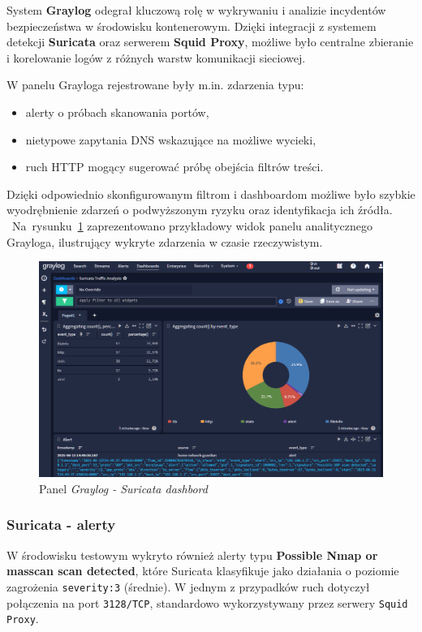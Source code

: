 \documentclass[
    left=2.5cm,         %
    right=2.5cm,        %
    top=2.5cm,          %
    bottom=3cm,         %
    bindingoffset=6mm,  %
    nohyphenation=true %
]{eiti/eiti-thesis} %
\begin{document}
System \textbf{Graylog} odegrał kluczową rolę w wykrywaniu i analizie incydentów bezpieczeństwa w środowisku kontenerowym. Dzięki integracji z systemem detekcji \textbf{Suricata} oraz serwerem \textbf{Squid Proxy}, możliwe było centralne zbieranie i korelowanie logów z różnych warstw komunikacji sieciowej.

W panelu Grayloga rejestrowane były m.in. zdarzenia typu:
\begin{itemize}
\item alerty o próbach skanowania portów,
\item nietypowe zapytania DNS wskazujące na możliwe wycieki,
\item ruch HTTP mogący sugerować próbę obejścia filtrów treści.
\end{itemize}

Dzięki odpowiednio skonfigurowanym filtrom i dashboardom możliwe było szybkie wyodrębnienie zdarzeń o podwyższonym ryzyku oraz identyfikacja ich źródła. 
~Na~rysunku~\ref{fig:graylog-suricata-dashboard} zaprezentowano przykładowy widok panelu analitycznego Grayloga, ilustrujący wykryte zdarzenia w czasie rzeczywistym.

\begin{figure}[H]
    \centering
    \includegraphics[width=\textwidth]{img/graylog_alerts.png}
    \caption{Panel \textit{Graylog - Suricata dashbord}}
    \label{fig:graylog-suricata-dashboard}
\end{figure}


\subsubsection{Suricata - alerty}
W środowisku testowym wykryto również alerty typu \textbf{Possible Nmap or masscan scan detected}, które Suricata klasyfikuje jako działania o poziomie zagrożenia \texttt{severity:3} (średnie). W jednym z przypadków ruch dotyczył połączenia na port \texttt{3128/TCP}, standardowo wykorzystywany przez serwery \texttt{Squid Proxy}.
\end{document}
